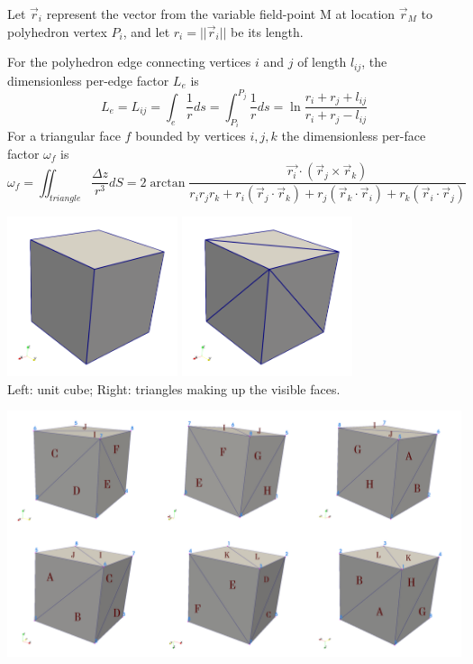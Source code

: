 Let $\vec{r}_i$ represent the vector from the variable 
field-point M at location $\vec{r}_M$ to polyhedron vertex $P_i$, 
and let $r_i = ||\vec{r}_i||$ be its length.


For the polyhedron edge connecting
vertices $i$ and $j$ of length $l_{ij}$, the dimensionless per-edge factor $L_e$ is
\[
L_e=L_{ij} = \int_e \frac{1}{r}ds = \int_{P_i}^{P_j} \frac{1}{r} ds 
= \ln \frac{r_i+r_j+l_{ij}}{r_i+r_j-l_{ij}}
\]
For a triangular face $f$ bounded by vertices $i,j,k$ the dimensionless
per-face factor $\omega_f$ is  
\[
\omega_f = 
\iint_{triangle} \frac{\Delta z}{r^3} dS 
= 2 \arctan \frac{\vec{r_i} \cdot (\vec{r}_j \times \vec{r}_k)}{r_ir_jr_k 
+r_i(\vec{r}_j\cdot\vec{r}_k) 
+r_j(\vec{r}_k\cdot\vec{r}_i) 
+r_k(\vec{r}_i\cdot\vec{r}_j) 
}
\]

\begin{center}
\includegraphics[width=5cm]{python_codes/fieldstone_113/images/hex1}
\includegraphics[width=5cm]{python_codes/fieldstone_113/images/hex2}\\
{\captionfont Left: unit cube; Right: triangles making up the visible faces.}
\end{center}

\begin{center}
\includegraphics[width=15cm]{python_codes/fieldstone_113/images/faces/drawing}
\end{center}


